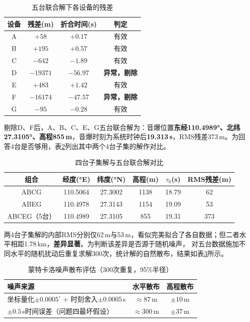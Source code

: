\documentclass[draft,12pt,a4paper]{ctexart}
\theoremstyle{definition}
\begin{document}
\begin{table}[H]\centering
  \caption{五台联合解下各设备的残差}\label{tab:residual}
  \small
  \begin{tabular}{cccc}
    \toprule
    \textbf{设备} & \textbf{残差(m)} & \textbf{折合时间(s)} & \textbf{判定} \\
    \midrule
    A & $+58$ & $+0.17$ & 有效 \\
    B & $+195$ & $+0.57$ & 有效 \\
    C & $-642$ & $-1.89$ & 有效 \\
    D & $-19371$ & $-56.97$ & \textbf{异常，剔除} \\
    E & $+483$ & $+1.42$ & 有效 \\
    F & $-16174$ & $-47.57$ & \textbf{异常，剔除} \\
    G & $-95$ & $-0.28$ & 有效 \\
    \bottomrule
  \end{tabular}
\end{table}


剔除D、F后，A、B、C、E、G五台联合解为：音爆位置\textbf{东经110.4989°、北纬27.3105°、高程855\,m}，音爆时刻为系统时钟后\textbf{19.313\,s}，RMS残差373\,m。为回答4台是否够用，表\ref{tab:candidates}列出其中两个4台子集的解作对比。

\begin{table}[H]\centering
  \caption{四台子集解与五台联合解对比}\label{tab:candidates}
  \small
  \begin{tabular}{cccccc}
    \toprule
    \textbf{组合} & \textbf{经度(°E)} & \textbf{纬度(°N)} & \textbf{高程(m)} & $\tau_0$\textbf{(s)} & \textbf{RMS残差(m)} \\
    \midrule
    ABCG & 110.5064 & 27.3002 & 1138 & 18.79 & 62 \\
    ABEG & 110.4978 & 27.3143 & 1154 & 19.09 & 53 \\
    ABCEG（5台） & 110.4989 & 27.3105 & 855 & 19.31 & 373 \\
    \bottomrule
  \end{tabular}
\end{table}

两4台子集解的内部RMS分别仅62\,m与53\,m，看似完美拟合了各自数据；但二者水平相距1.78\,km，\textbf{差异显著}。为判断该差异是否源于随机噪声，
对五台数据施加不同水平的随机扰动后重复求解300次，统计解的自然散布，结果如表\ref{tab:monte}所示。

\begin{table}[H]\centering
  \caption{蒙特卡洛噪声散布评估（300次重复，95\%半径）}\label{tab:monte}
  \small
  \begin{tabular}{lcc}
    \toprule
    \textbf{噪声来源} & \textbf{水平散布} & \textbf{高程散布} \\
    \midrule
    坐标量化$\pm0.0005^\circ$ + 时刻舍入$\pm0.0005$\,s & $\approx87$\,m & $\pm10$\,m \\
    $\pm0.5$\,s时间误差（问题四最坏假设） & $\approx300$\,m & $\pm37$\,m \\
    \bottomrule
  \end{tabular}
\end{table}
\end{document}
